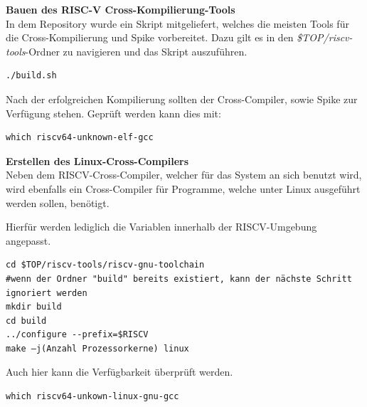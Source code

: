 \textbf{Bauen des RISC-V Cross-Kompilierung-Tools}\\

In dem Repository wurde ein Skript mitgeliefert, welches die meisten Tools für die Cross-Kompilierung und Spike vorbereitet.
Dazu gilt es in den \emph{\$TOP/riscv-tools}-Ordner zu navigieren und das Skript
auszuführen.\\

\begin{lstlisting}[caption={Ausführen des \emph{build}-Skripts},label={code:buildskript}]
./build.sh
\end{lstlisting}



Nach der erfolgreichen Kompilierung sollten der Cross-Compiler, sowie Spike zur Verfügung stehen. Geprüft werden kann dies mit:\\

\begin{lstlisting}[caption={Überprüfung der Erreichbarkeit des Compilers},label={code:elfgcc}]
which riscv64-unknown-elf-gcc
\end{lstlisting}


\vspace{5mm}
\textbf{Erstellen des Linux-Cross-Compilers}\\

Neben dem RISCV-Cross-Compiler, welcher für das System an sich benutzt wird, wird ebenfalls ein Cross-Compiler für Programme, welche unter Linux ausgeführt werden sollen, benötigt.

Hierfür werden lediglich die Variablen innerhalb der RISCV-Umgebung angepasst.\\

\begin{lstlisting}[caption={Anpassung der RISCV-Umgebung},label={code:riscvumgebung},extendedchars=false]
cd $TOP/riscv-tools/riscv-gnu-toolchain
#wenn der Ordner "build" bereits existiert, kann der nächste Schritt ignoriert werden
mkdir build
cd build
../configure --prefix=$RISCV
make –j(Anzahl Prozessorkerne) linux
\end{lstlisting}

\newpage
Auch hier kann die Verfügbarkeit überprüft werden.\\

\begin{lstlisting}[caption={Überprüfung der Erreichbarkeit des Linux-Compilers},label={code:linuxgcc}]
which riscv64-unkown-linux-gnu-gcc
\end{lstlisting}

